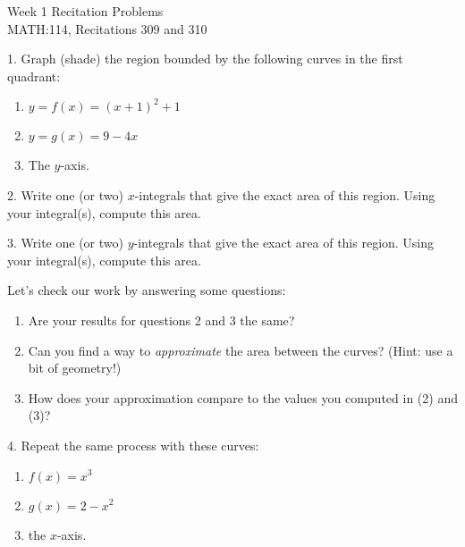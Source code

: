 \documentclass[12pt]{article}
\begin{document}
	\thispagestyle{empty}

	{
		\centering
		\huge{Week 1 Recitation Problems} \\
		\Large{MATH:114, Recitations 309 and 310} \\
	}
	
	\vspace{3em}
	1. Graph (shade) the region bounded by the following curves in the first quadrant:
	
	\begin{enumerate}[label=(\alph*)]
		\item $y = f(x) = (x+1)^2 + 1$
		\item $y = g(x) = 9-4x$
		\item The $y$-axis.
	\end{enumerate}
	
	\vspace{12em}
	
	2. Write one (or two) $x$-integrals that give the exact area of this region. Using your integral(s), compute this area.
	
	\vspace{12em}
	
	3. Write one (or two) $y$-integrals that give the exact area of this region. Using your integral(s), compute this area.
	
	\newpage
	
	Let's check our work by answering some questions:
	
	\begin{enumerate}
		\item Are your results for questions 2 and 3 the same?
		\item Can you find a way to \textit{approximate} the area between the curves? (Hint: use a bit of geometry!)
		\item How does your approximation compare to the values you computed in (2) and (3)?	
	\end{enumerate}
	
	\vspace{12em}
	
	4. Repeat the same process with these curves:
	
	\begin{enumerate}
		\item $f(x)=x^3$
		\item $g(x)=2-x^2$
		\item the $x$-axis.
	\end{enumerate}

	
\end{document}
